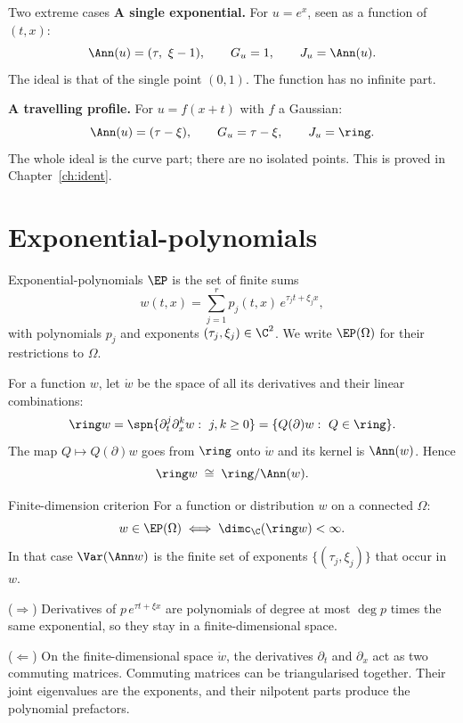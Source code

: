 \begin{example}{Two extreme cases}
\textbf{A single exponential.} For $u=e^{x}$, seen as a function of $(t,x)$:
\[
\Ann(u)=(\tau,\ \xi-1),\qquad G_u=1,\qquad J_u=\Ann(u).
\]
The ideal is that of the single point $(0,1)$. The function has no infinite part.

\textbf{A travelling profile.} For $u=f(x+t)$ with $f$ a Gaussian:
\[
\Ann(u)=(\tau-\xi),\qquad G_u=\tau-\xi,\qquad J_u=\ring .
\]
The whole ideal is the curve part; there are no isolated points. This is proved in Chapter~\ref{ch:ident}.
\end{example}

\section{Exponential-polynomials}

\begin{definition}{Exponential-polynomials}\label{def:ep}
$\EP$ is the set of finite sums
\[
w(t,x)=\sum_{j=1}^{r}p_j(t,x)\,e^{\tau_jt+\xi_jx},
\]
with polynomials $p_j$ and exponents $(\tau_j,\xi_j)\in\C^2$. We write $\EP(\Omega)$ for their restrictions to $\Omega$.
\end{definition}

For a function $w$, let $\ring w$ be the space of all its derivatives and their linear combinations:
\[
\ring w=\spn\{\partial_t^j\partial_x^k w:\ j,k\ge0\}=\{Q(\partial)w:\ Q\in\ring\}.
\]
The map $Q\mapsto Q(\partial)w$ goes from $\ring$ onto $\ring w$ and its kernel is $\Ann(w)$. Hence
\[
\ring w\;\cong\;\ring/\Ann(w).
\]

\begin{lemma}{Finite-dimension criterion  \proved}\label{lem:ep}
For a function or distribution $w$ on a connected $\Omega$:
\[
w\in\EP(\Omega)\iff\dimc_\C(\ring w)<\infty .
\]
In that case $\Var(\Ann w)$ is the finite set of exponents $\{(\tau_j,\xi_j)\}$ that occur in $w$.

\end{lemma}

\begin{intuition}
($\Rightarrow$) Derivatives of $p\,e^{\tau t+\xi x}$ are polynomials of degree at most $\deg p$ times the same exponential, so they stay in a finite-dimensional space.

($\Leftarrow$) On the finite-dimensional space $\ring w$, the derivatives $\partial_t$ and $\partial_x$ act as two commuting matrices. Commuting matrices can be triangularised together. Their joint eigenvalues are the exponents, and their nilpotent parts produce the polynomial prefactors.
\end{intuition}

